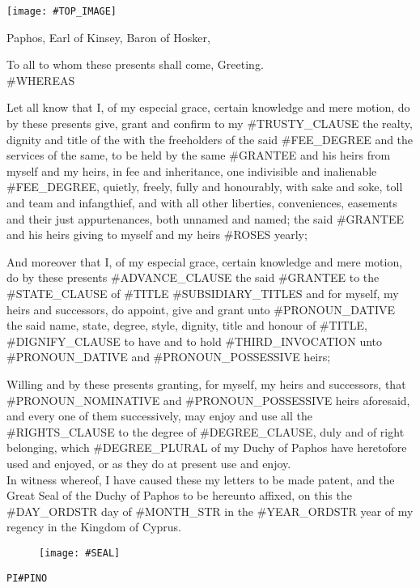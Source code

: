 \documentclass[varwidth=true,border=50pt]{standalone}
\begin{document}
\thispagestyle{fancy}

\noindent \texttt{[image: \#TOP\_IMAGE]}

{\LARGE
    Paphos, Earl of Kinsey, Baron of Hosker,

    \hspace{20pt} To all to whom these presents shall come, Greeting.\\

    #WHEREAS

    Let all know that I, of my especial grace, certain knowledge and mere motion, do by these presents give, grant and confirm to my #TRUSTY_CLAUSE \hspace{7pt}{\hoskeroe #GRANTEE}\hspace{7pt} the realty, dignity and title of the \hspace{7pt}{\hoskeroe #FEE_TITLE}\hspace{7pt} with the freeholders of the said #FEE_DEGREE and the services of the same, to be held by the same #GRANTEE and his heirs from myself and my heirs, in fee and inheritance, one indivisible and inalienable #FEE_DEGREE, quietly, freely, fully and honourably, with sake and soke, toll and team and infangthief, and with all other liberties, conveniences, easements and their just appurtenances, both unnamed and named; the said #GRANTEE and his heirs giving to myself and my heirs #ROSES yearly;

    \hspace{20pt} And moreover that I, of my especial grace, certain knowledge and mere motion, do by these presents #ADVANCE_CLAUSE the said #GRANTEE to the #STATE_CLAUSE of #TITLE #SUBSIDIARY_TITLES and for myself, my heirs and successors, do appoint, give and grant unto #PRONOUN_DATIVE the said name, state, degree, style, dignity, title and honour of #TITLE, #DIGNIFY_CLAUSE to have and to hold #THIRD_INVOCATION unto #PRONOUN_DATIVE and #PRONOUN_POSSESSIVE heirs;

    \hspace{20pt} Willing and by these presents granting, for myself, my heirs and successors, that #PRONOUN_NOMINATIVE and #PRONOUN_POSSESSIVE heirs aforesaid, and every one of them successively, may enjoy and use all the #RIGHTS_CLAUSE to the degree of #DEGREE_CLAUSE, duly and of right belonging, which #DEGREE_PLURAL of my Duchy of Paphos have heretofore used and enjoyed, or as they do at present use and enjoy.\\

    \hspace{20pt} In witness whereof, I have caused these my letters to be made patent, and the Great Seal of the Duchy of Paphos to be hereunto affixed, on this the #DAY_ORDSTR day of #MONTH_STR in the #YEAR_ORDSTR year of my regency in the Kingdom of Cyprus.
}

\begin{figure}[h]
    \centering
    \texttt{[image: \#SEAL]}
\end{figure}

\hfill {\footnotesize \texttt{PI{#PINO}}}
\end{document}

